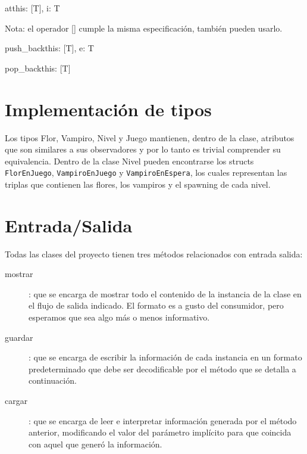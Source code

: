 \documentclass[spanish,a4paper]{article}
\begin{document}
\begin{problema}{at}{this: [T], i: \ent}{T}
\end{problema}
Nota: el operador [] cumple la misma especificaci\'on, tambi\'en pueden usarlo.

\begin{problema}{push\_back}{this: [T], e: T}{}
\end{problema}

\begin{problema}{pop\_back}{this: [T]}{}
\end{problema}

\section{Implementaci\'on de tipos}

Los tipos Flor, Vampiro, Nivel y Juego mantienen, dentro de la clase, atributos que son similares a sus observadores y por lo tanto es trivial comprender su equivalencia. Dentro de la clase Nivel pueden encontrarse los structs \texttt{FlorEnJuego}, \texttt{VampiroEnJuego} y \texttt{VampiroEnEspera}, los cuales representan las triplas que contienen las flores, los vampiros y el spawning de cada nivel.

\section{Entrada/Salida}

Todas las clases del proyecto tienen tres m\'etodos relacionados con
entrada salida:

\begin{description}
\item[mostrar]: que se encarga de mostrar todo el contenido de la
  instancia de la clase en el flujo de salida indicado. El formato
  es a gusto del consumidor, pero esperamos que sea algo m\'as o menos informativo.
\item[guardar]: que se encarga de escribir la informaci\'on de cada
  instancia en un formato predeterminado que debe ser decodificable
  por el m\'etodo que se detalla a continuaci\'on.
\item[cargar]: que se encarga de leer e interpretar informaci\'on
  generada por el m\'etodo anterior, modificando el valor del
  par\'ametro impl\'icito para que coincida con aquel que gener\'o la
  informaci\'on.
\end{description}
\end{document}
